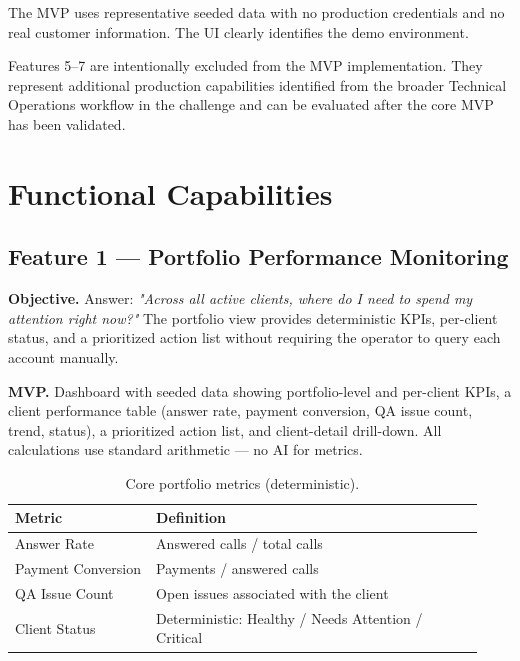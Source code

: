 \documentclass[11pt,a4paper]{article}
\begin{document}
The MVP uses representative seeded data with no production credentials and no real customer information. The UI clearly identifies the demo environment.

Features 5--7 are intentionally excluded from the MVP implementation. They represent additional production capabilities identified from the broader Technical Operations workflow in the challenge and can be evaluated after the core MVP has been validated.

\section{Functional Capabilities}

\subsection{Feature 1 — Portfolio Performance Monitoring}

\textbf{Objective.} Answer: \emph{"Across all active clients, where do I need to spend my attention right now?"} The portfolio view provides deterministic KPIs, per-client status, and a prioritized action list without requiring the operator to query each account manually.

\textbf{MVP.} Dashboard with seeded data showing portfolio-level and per-client KPIs, a client performance table (answer rate, payment conversion, QA issue count, trend, status), a prioritized action list, and client-detail drill-down. All calculations use standard arithmetic — no AI for metrics.

\begin{table}[H]
\centering
\small
\begin{tabular}{p{0.28\linewidth}p{0.65\linewidth}}
\toprule
\textbf{Metric} & \textbf{Definition} \\
\midrule
Answer Rate         & Answered calls / total calls \\
Payment Conversion  & Payments / answered calls \\
QA Issue Count      & Open issues associated with the client \\
Client Status       & Deterministic: Healthy / Needs Attention / Critical \\
\bottomrule
\end{tabular}
\caption{Core portfolio metrics (deterministic).}
\end{table}
\end{document}
